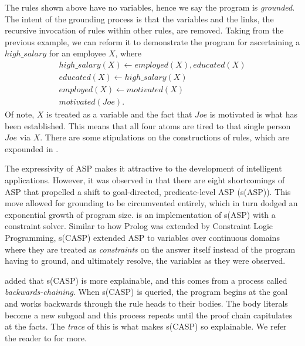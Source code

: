 \documentclass[11pt]{article}
\begin{document}
The rules shown above have no variables, hence we say the program is \textit{grounded}. The intent of the grounding process is that the variables and the links, the recursive invocation of rules within other rules, are removed. Taking from the previous example, we can reform it to demonstrate the program for ascertaining a $high\_salary$ for an employee $X$, where
\begin{equation*}
    \begin{align*}
        high\_salary(X) \leftarrow employed(X), educated(X) \\
        educated(X) \leftarrow high\_salary(X)\\
        employed(X) \leftarrow motivated(X)\\
        motivated(Joe).
    \end{align*}
\end{equation*}
Of note, $X$ is treated as a variable and the fact that $Joe$ is motivated is what has been established. This means that all four atoms are tired to that single person $Joe$ via $X$. There are some stipulations on the constructions of rules, which are expounded in \cite{ARIAS_CARRO_SALAZAR_MARPLE_GUPTA_2018}.

The expressivity of ASP makes it attractive to the development of intelligent applications. However, it was observed in \cite{Marple2017TheS} that there are eight shortcomings of ASP that propelled a shift to goal-directed, predicate-level ASP (s(ASP)). This move allowed for grounding to be circumvented entirely, which in turn dodged an exponential growth of program size. \cite{ARIAS_CARRO_SALAZAR_MARPLE_GUPTA_2018} is an implementation of s(ASP) with a constraint solver. Similar to how Prolog was extended by Constraint Logic Programming, s(CASP) extended ASP to variables over continuous domains where they are treated as \textit{constraints} on the answer itself instead of the program having to ground, and ultimately resolve, the variables as they were observed. 

\cite{Arias_2020} added that s(CASP) is more explainable, and this comes from a process called \textit{backwards-chaining}. When s(CASP) is queried, the program begins at the goal and works backwards through the rule heads to their bodies. The body literals become a new subgoal and this process repeats until the proof chain capitulates at the facts. The \textit{trace} of this is what makes s(CASP) so explainable. We refer the reader to \cite{Arias_2020} for more. 
\end{document}
